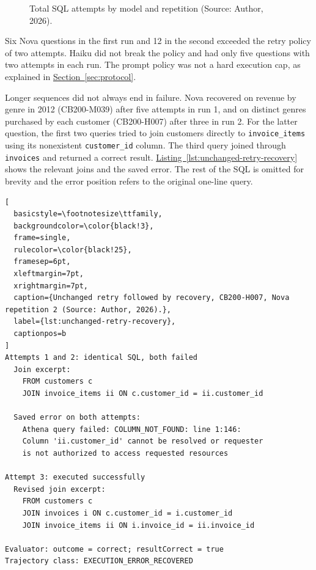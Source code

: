 \begin{figure}[H]
\centering

\caption{Total SQL attempts by model and repetition (Source: Author, 2026).}
\label{fig:results-attempts}
\end{figure}

Six Nova questions in the first run and 12 in the second exceeded the retry policy of two attempts.
Haiku did not break the policy and had only five questions with two attempts in each run.
The prompt policy was not a hard execution cap, as explained in
\hyperref[sec:protocol]{Section~\ref*{sec:protocol}}.

Longer sequences did not always end in failure.
Nova recovered on revenue by genre in 2012 (CB200-M039) after five attempts in run 1,
and on distinct genres purchased by each customer (CB200-H007) after three in run 2.
For the latter question, the first two queries tried to join customers directly to
\texttt{invoice\_items} using its nonexistent \texttt{customer\_id} column.
The third query joined through \texttt{invoices} and returned a correct result.
\hyperref[lst:unchanged-retry-recovery]{Listing~\ref*{lst:unchanged-retry-recovery}}
shows the relevant joins and the saved error. The rest of the SQL is omitted for brevity
and the error position refers to the original one-line query.

\noindent\begin{minipage}{\linewidth}
\begin{lstlisting}[
  basicstyle=\footnotesize\ttfamily,
  backgroundcolor=\color{black!3},
  frame=single,
  rulecolor=\color{black!25},
  framesep=6pt,
  xleftmargin=7pt,
  xrightmargin=7pt,
  caption={Unchanged retry followed by recovery, CB200-H007, Nova repetition 2 (Source: Author, 2026).},
  label={lst:unchanged-retry-recovery},
  captionpos=b
]
Attempts 1 and 2: identical SQL, both failed
  Join excerpt:
    FROM customers c
    JOIN invoice_items ii ON c.customer_id = ii.customer_id

  Saved error on both attempts:
    Athena query failed: COLUMN_NOT_FOUND: line 1:146:
    Column 'ii.customer_id' cannot be resolved or requester
    is not authorized to access requested resources

Attempt 3: executed successfully
  Revised join excerpt:
    FROM customers c
    JOIN invoices i ON c.customer_id = i.customer_id
    JOIN invoice_items ii ON i.invoice_id = ii.invoice_id

Evaluator: outcome = correct; resultCorrect = true
Trajectory class: EXECUTION_ERROR_RECOVERED
\end{lstlisting}
\end{minipage}


